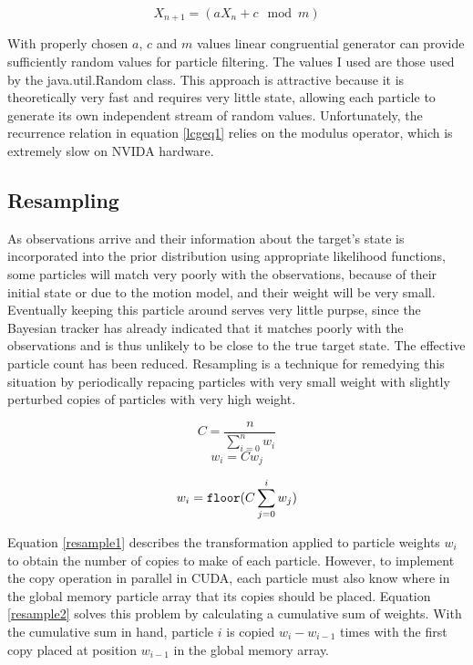 \documentclass{article}
\begin{document}
\begin{equation}\label{lcgeq1}
X_{n+1}=(aX_{n}+c \mod m)
\end{equation}

With properly chosen \(a\), \(c\) and \(m\) values linear congruential generator can provide sufficiently random values for particle filtering\cite{lcg}. The values I used are those used by the java.util.Random class. This approach is attractive because it is theoretically very fast and requires very little state, allowing each particle to generate its own independent stream of random values. Unfortunately, the recurrence relation in equation \ref{lcgeq1} relies on the modulus operator, which is extremely slow on NVIDA hardware.\cite{oprc}

\subsection{Resampling}
As observations arrive and their information about the target's state is incorporated into the prior distribution using appropriate likelihood functions, some particles will match very poorly with the observations, because of their initial state or due to the motion model, and their weight will be very small. Eventually keeping this particle around serves very little purpse, since the Bayesian tracker has already indicated that it matches poorly with the observations and is thus unlikely to be close to the true target state. The effective particle count has been reduced. Resampling is a technique for remedying this situation by periodically repacing particles with very small weight with slightly perturbed copies of particles with very high weight.

\[ C = \frac{n}{\sum_{i=0}^{n} w_{i}} \]
\begin{equation}\label{resample1}
w_{i}=C w_{j}
\end{equation}

\begin{equation}\label{resample2}
w_{i}=\verb!floor!(C\sum_{j=0}^{i} w_{j})
\end{equation}

Equation \ref{resample1} describes the transformation applied to particle weights \(w_{i}\) to obtain the number of copies to make of each particle. However, to implement the copy operation in parallel in CUDA, each particle must also know where in the global memory particle array that its copies should be placed. Equation \ref{resample2} solves this problem by calculating a cumulative sum of weights. With the cumulative sum in hand, particle \(i\) is copied \(w_{i}-w_{i-1}\) times with the first copy placed at position \(w_{i-1}\) in the global memory array.
\end{document}
